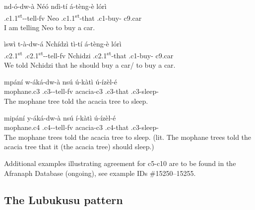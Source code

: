 \documentclass[output=paper,
modfonts
]{langscibook}
\begin{document}
\ex \label{1c} \gll nd-ó-dw-à		 Néó	ndì-tí 		 á-tèng-è		lórì \\
.c1.1\textsuperscript{st}--tell-fv  Neo  .c1.1\textsuperscript{st}-that	 .c1-buy-	c9.car \\
\glt I am telling Neo to buy a car.
  
\ex \label{1d} \gll ìswì   t-à-dw-á   Nchídzì  tì-tí  á-tèng-è	 lórì \\
.c2.1\textsuperscript{st}  .c2.1\textsuperscript{st}--tell-fv   Nchidzi  .c2.1\textsuperscript{st}-that .c1-buy- c9.car\\
\glt We told Nchidzi that he should buy a car/ to buy a car.

\ex \label{1e} \gll mpání	w-áká-dw-à	nsú	ú-kàtì	ú-ízèl-é \\
mophane.c3	.c3--tell-fv acacia-c3	.c3-that	.c3-sleep-\\
\glt The mophane tree told the acacia tree to sleep.

\ex \label{1f} \gll	mipání		y-áká-dw-à			nsú		í-kàtì		ú-ízèl-é\\
mophane.c4	.c4--tell-fv	acacia-c3	.c4-that	.c3-sleep-\\
\glt The mophane trees told the acacia tree to sleep.  (lit. The mophane trees told the acacia  tree that it (the acacia tree) should sleep.)
\z
\z 

Additional examples illustrating agreement for c5-c10 are to be found in the Afranaph Database (ongoing), see example IDs \#15250--15255.

\subsection{The Lubukusu pattern}
\end{document}
